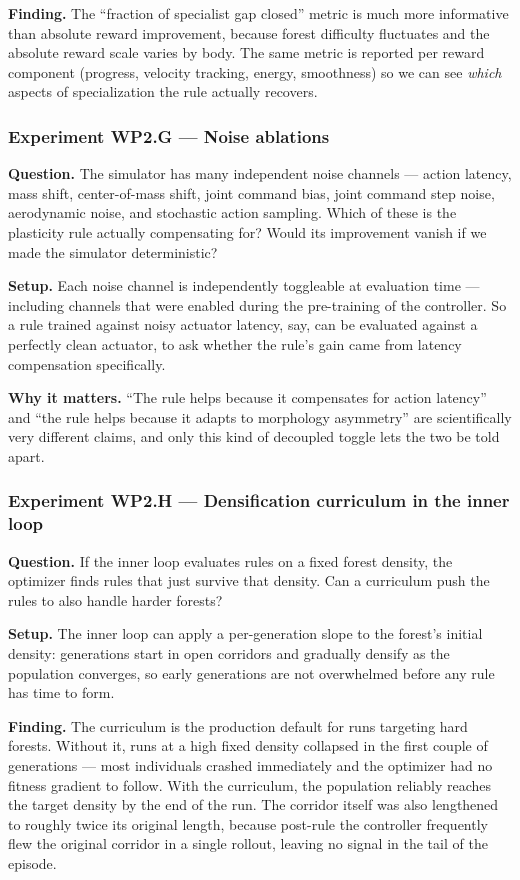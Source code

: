 \documentclass[letterpaper,10pt]{article}
\begin{document}
\textbf{Finding.} The ``fraction of specialist gap closed'' metric is much more informative than absolute reward improvement, because forest difficulty fluctuates and the absolute reward scale varies by body. The same metric is reported per reward component (progress, velocity tracking, energy, smoothness) so we can see \emph{which} aspects of specialization the rule actually recovers.

\subsubsection{Experiment WP2.G --- Noise ablations}
\textbf{Question.} The simulator has many independent noise channels --- action latency, mass shift, center-of-mass shift, joint command bias, joint command step noise, aerodynamic noise, and stochastic action sampling. Which of these is the plasticity rule actually compensating for? Would its improvement vanish if we made the simulator deterministic?

\textbf{Setup.} Each noise channel is independently toggleable at evaluation time --- including channels that were enabled during the pre-training of the controller. So a rule trained against noisy actuator latency, say, can be evaluated against a perfectly clean actuator, to ask whether the rule's gain came from latency compensation specifically.

\textbf{Why it matters.} ``The rule helps because it compensates for action latency'' and ``the rule helps because it adapts to morphology asymmetry'' are scientifically very different claims, and only this kind of decoupled toggle lets the two be told apart.

\subsubsection{Experiment WP2.H --- Densification curriculum in the inner loop}
\textbf{Question.} If the inner loop evaluates rules on a fixed forest density, the optimizer finds rules that just survive that density. Can a curriculum push the rules to also handle harder forests?

\textbf{Setup.} The inner loop can apply a per-generation slope to the forest's initial density: generations start in open corridors and gradually densify as the population converges, so early generations are not overwhelmed before any rule has time to form.

\textbf{Finding.} The curriculum is the production default for runs targeting hard forests. Without it, runs at a high fixed density collapsed in the first couple of generations --- most individuals crashed immediately and the optimizer had no fitness gradient to follow. With the curriculum, the population reliably reaches the target density by the end of the run. The corridor itself was also lengthened to roughly twice its original length, because post-rule the controller frequently flew the original corridor in a single rollout, leaving no signal in the tail of the episode.
\end{document}

